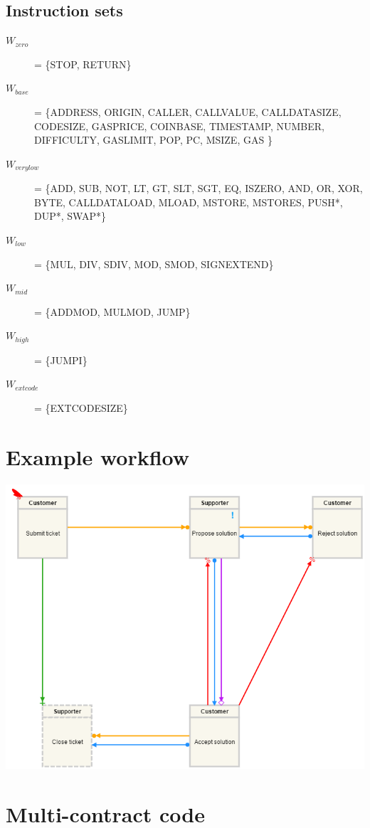 \documentclass{article}
\begin{document}
		\subsection{Instruction sets}
		\begin{description}
			\item[$W_{zero}$] = \{STOP, RETURN\}
			\item[$W_{base}$] = \{ADDRESS, ORIGIN, CALLER, CALLVALUE, CALLDATASIZE, CODESIZE, GASPRICE, COINBASE, TIMESTAMP, NUMBER, DIFFICULTY, GASLIMIT, POP, PC, MSIZE, GAS \}
			\item[$W_{verylow}$] = \{ADD, SUB, NOT, LT, GT, SLT, SGT, EQ, ISZERO, AND, OR, XOR, BYTE, CALLDATALOAD, MLOAD, MSTORE, MSTORES, PUSH*, DUP*, SWAP*\}
			\item[$W_{low}$] = \{MUL, DIV, SDIV, MOD, SMOD, SIGNEXTEND\}
			\item[$W_{mid}$] = \{ADDMOD, MULMOD, JUMP\}
			\item[$W_{high}$] = \{JUMPI\}
			\item[$W_{extcode}$] = \{EXTCODESIZE\}			
		\end{description}

	\section{Example workflow}
	\label{app:example-workflow}
		\includegraphics[scale=0.65, angle=90]{figures/ExampleWorkflow.png}
		\clearpage

	\section{Multi-contract code}
	\label{app:multi-contract-code}
\end{document}
